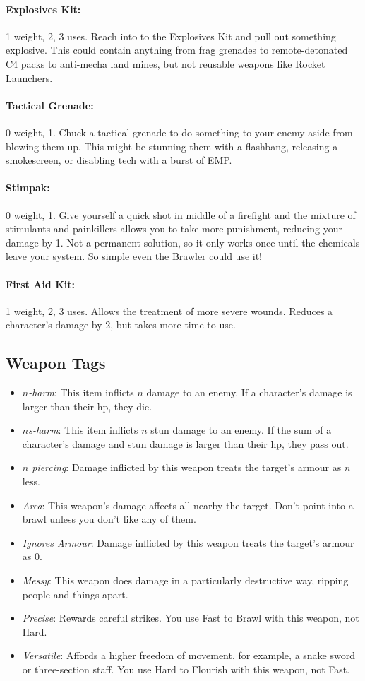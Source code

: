 \paragraph{Explosives Kit:} 1 weight, 2\money, 3 uses. Reach into to the Explosives Kit and pull out something explosive. This could contain anything from frag grenades to remote-detonated C4 packs to anti-mecha land mines, but not reusable weapons like Rocket Launchers.
\paragraph{Tactical Grenade:} 0 weight, 1\money. Chuck a tactical grenade to do something to your enemy aside from blowing them up. This might be stunning them with a flashbang, releasing a smokescreen, or disabling tech with a burst of EMP.
\paragraph{Stimpak:} 0 weight, 1\money. Give yourself a quick shot in middle of a firefight and the mixture of stimulants and painkillers allows you to take more punishment, reducing your damage by 1. Not a permanent solution, so it only works once until the chemicals leave your system. So simple even the Brawler could use it!
\paragraph{First Aid Kit:} 1 weight, 2\money, 3 uses. Allows the treatment of more severe wounds. Reduces a character's damage by 2, but takes more time to use.

\subsection{Weapon Tags}
\begin{itemize}
\item \textit{$n$-harm}: This item inflicts $n$ damage to an enemy. If a character's damage is larger than their hp, they die.
\item \textit{$n$s-harm}: This item inflicts $n$ stun damage to an enemy. If the sum of a character's damage and stun damage is larger than their hp, they pass out.
\item \textit{$n$ piercing}: Damage inflicted by this weapon treats the target's armour as $n$ less. 
\item \textit{Area}: This weapon's damage affects all nearby the target. Don't point into a brawl unless you don't like any of them.
\item \textit{Ignores Armour}: Damage inflicted by this weapon treats the target's armour as 0. 
\item \textit{Messy}: This weapon does damage in a particularly destructive way, ripping people and things apart.
\item \textit{Precise}: Rewards careful strikes. You use Fast to Brawl with this weapon, not Hard.
\item \textit{Versatile}: Affords a higher freedom of movement, for example, a snake sword or three-section staff. You use Hard to Flourish with this weapon, not Fast.
\end{itemize}

